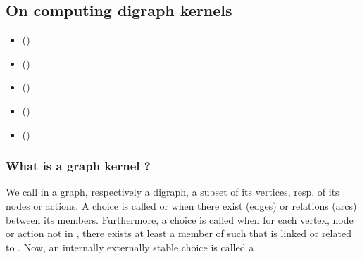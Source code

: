 \documentclass[a4paper,12pt,english]{sphinxhowto}
\begin{document}
\subsection{On computing digraph kernels}
\label{\detokenize{pearls:on-computing-digraph-kernels}}\label{\detokenize{pearls:kernel-tutorial-label}}
\begin{sphinxcontents}
\begin{itemize}
\item {} 
\sphinxAtStartPar
{}\label{\detokenize{pearls:id154}}{\hyperref[\detokenize{pearls:what-is-a-graph-kernel}]{}} ()

\item {} 
\sphinxAtStartPar
{}\label{\detokenize{pearls:id155}}{\hyperref[\detokenize{pearls:initial-and-terminal-kernels}]{}} ()

\item {} 
\sphinxAtStartPar
{}\label{\detokenize{pearls:id156}}{\hyperref[\detokenize{pearls:kernels-in-lateralized-digraphs}]{}} ()

\item {} 
\sphinxAtStartPar
{}\label{\detokenize{pearls:id157}}{\hyperref[\detokenize{pearls:computing-first-and-last-choice-recommendations}]{}} ()

\item {} 
\sphinxAtStartPar
{}\label{\detokenize{pearls:id158}}{\hyperref[\detokenize{pearls:tractability}]{}} ()

\end{itemize}
\end{sphinxcontents}


\subsubsection{What is a graph kernel ?}
\label{\detokenize{pearls:what-is-a-graph-kernel}}
\sphinxAtStartPar
We call  in a graph, respectively a digraph, a subset of its vertices, resp. of its nodes or actions. A choice  is called  or  when there exist  (edges) or relations (arcs) between its members. Furthermore, a choice  is called  when for each vertex, node or action  not in , there exists at least a member  of  such that  is linked or related to . Now, an internally  externally stable choice is called a .
\end{document}
